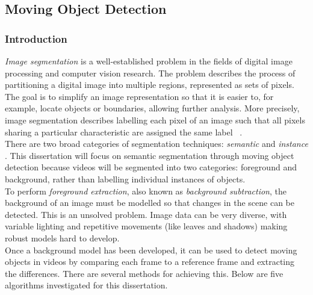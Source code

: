 \subsection{Moving Object Detection}
\label{sec:movingObjectDetection}
\subsubsection{Introduction}
\indent \indent
\textit{Image segmentation} is a well-established problem in the fields of digital image processing and computer vision research. The problem describes the process of partitioning a digital image into multiple regions, represented as sets of pixels. The goal is to simplify an image representation so that it is easier to, for example, locate objects or boundaries, allowing further analysis. More precisely, image segmentation describes labelling each pixel of an image such that all pixels sharing a particular characteristic are assigned the same label ~\cite{Shapiro}.
\smallskip \\ \indent
There are two broad categories of segmentation techniques: \textit{semantic} \cite{Semantic} and \textit{instance} \cite{Instance}. This dissertation will focus on semantic segmentation through moving object detection because videos will be segmented into two categories: foreground and background, rather than labelling individual instances of objects.
\smallskip \\ \indent
To perform \textit{foreground extraction}, also known as \textit{background subtraction}, the background of an image must be modelled so that changes in the scene can be detected. This is an unsolved problem. Image data can be very diverse, with variable lighting and repetitive movements (like leaves and shadows) making robust models hard to develop.
\smallskip \\ \indent
Once a background model has been developed, it can be used to detect moving objects in videos by comparing each frame to a reference frame and extracting the differences. There are several methods for achieving this. Below are five algorithms investigated for this dissertation.
